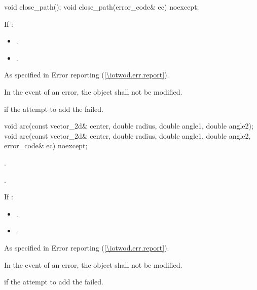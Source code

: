 \begin{itemdecl}
    void close_path();
    void close_path(error_code& ec) noexcept;
\end{itemdecl}
\begin{itemdescr}
	\pnum
	\effects
	If :
	\begin{itemize}
	\item {}.
	
	\item {}.
	\end{itemize}
	
	\pnum
	\throws
	As specified in Error reporting (\ref{\iotwod.err.report}).

	\pnum
	\remarks
	In the event of an error, the object shall not be modified.

	\pnum
	\errors
	 if the attempt to add the  failed.
\end{itemdescr}

\begin{itemdecl}
    void arc(const vector_2d& center, double radius, double angle1,
      double angle2);
    void arc(const vector_2d& center, double radius, double angle1,
      double angle2, error_code& ec) noexcept;
\end{itemdecl}
\begin{itemdescr}
	\pnum
	\effects
	.
	
	\pnum
	.
	
	\pnum
	If :
	\begin{itemize}
	\item {}.
	
	\item {}.
	\end{itemize}
	
	\pnum
	\throws
	As specified in Error reporting (\ref{\iotwod.err.report}).

	\pnum
	\remarks
	In the event of an error, the object shall not be modified.

	\pnum
	\errors
	 if the attempt to add the  failed.
\end{itemdescr}

